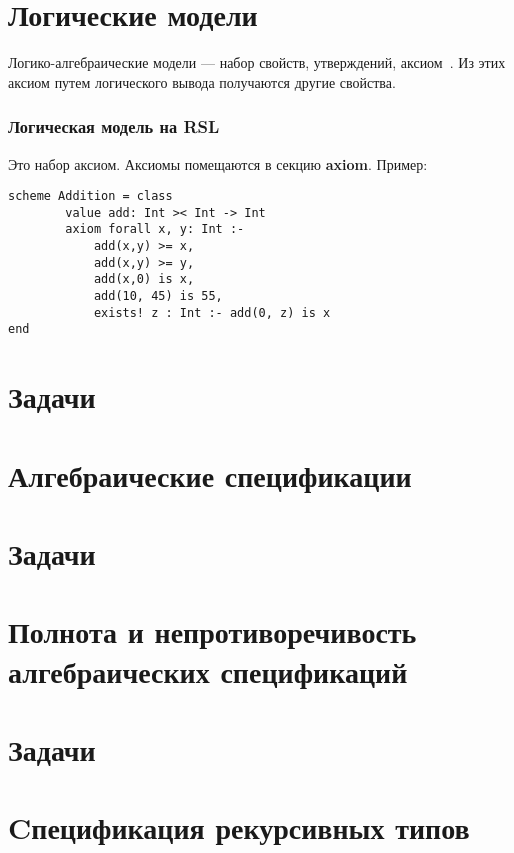 \documentclass[14pt, twoside]{extreport}
\newcounter{problem_type}[chapter]
\newcommand{\head}[1]{\vspace{1cm}\subsubsection*{#1}}
\begin{document}
\section{Логические модели}

Логико-алгебраические модели --- набор свойств, утверждений, аксиом~\cite{kuliamin}. Из этих аксиом путем логического вывода получаются другие свойства.

\head{Логическая модель на RSL}
Это набор аксиом. Аксиомы помещаются в секцию \textbf{axiom}. Пример:
\begin{lstlisting}
scheme Addition = class
        value add: Int >< Int -> Int
        axiom forall x, y: Int :-
            add(x,y) >= x,
            add(x,y) >= y,
            add(x,0) is x,
            add(10, 45) is 55,
            exists! z : Int :- add(0, z) is x
end
\end{lstlisting}

\section*{Задачи}



\section{Алгебраические спецификации}



\section*{Задачи}









\section{Полнота и непротиворечивость алгебраических спецификаций}



\section*{Задачи}



\section{Cпецификация рекурсивных типов}
\end{document}
